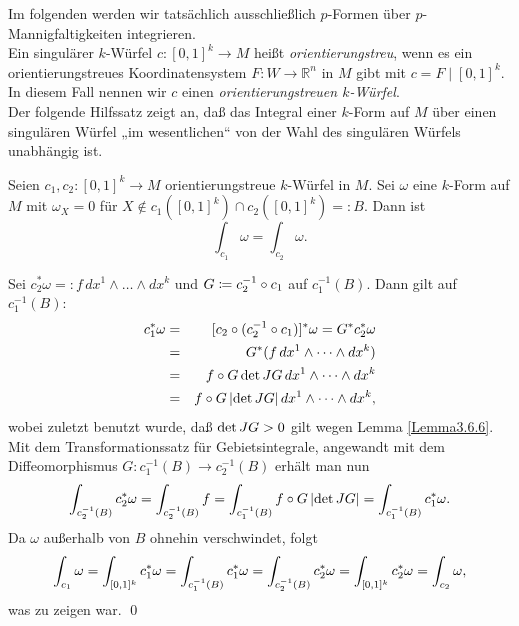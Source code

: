 \documentclass[a4paper,twoside,DIV15,BCOR12mm]{scrbook}
\begin{document}
\noindent
Im folgenden werden wir tatsächlich ausschließlich $p$-Formen über $p$-Mannigfaltigkeiten 
integrieren.\\

 Ein singulärer $k$-Würfel $c: [0,1]^{k} \to M$ 
heißt {\em orientierungstreu}, wenn es ein orientierungstreues Koordinatensystem 
$F: W \to {\mathbb R}^{n}$ in $M$ gibt mit $c = F \mid [0,1]^{k}$. In diesem Fall nennen 
wir $c$ einen {\em orientierungstreuen $k$-Würfel}.\\

\noindent
Der folgende Hilfssatz zeigt an, daß das Integral einer $k$-Form auf $M$ 
über einen singulären Würfel „im wesentlichen“ von der Wahl des 
singulären Würfels unabhängig ist.

\bigskip

\begin{lemma}\label{Lemma3.7.1} {Seien $c_{1},c_{2}: [0,1]^{k} \to M$ 
orientierungstreue  $k$-Würfel in $M$. Sei $\omega$ eine $k$-Form auf $M$ 
mit $\omega_{X} = 0$ für $X \notin c_{1}([0,1]^{k}) \cap c_{2}([0,1]^{k}) =: B$. 
Dann ist}
\[ \int_{c_1} \omega = \int_{c_2} \omega. \]
\end{lemma}


 Sei $c_{2}^{*}\omega =: f \, dx^{1} \wedge \dots \wedge dx^{k}$ 
und $G \da  c_{2}^{-1} \circ c_{1}$ auf $c_{1}^{-1}(B)$. Dann gilt auf $c_{1}^{-1}(B)$:
\begin{eqnarray*}
c_{1}^{*}\omega & = & [c_{2} \circ (c_{2}^{-1} \circ c_{1})]^{*} \omega = 
G^{*} c_{2}^{*} \omega \\
& = & G^{*}(f \, dx^{1} \wedge \dots \wedge dx^{k}) \\
& = & f \circ G\, {\rm det}\, JG \, dx^{1} \wedge \dots \wedge dx^{k} \\
& = & f \circ G\, |{\rm det}\, JG| \, dx^{1} \wedge \dots \wedge dx^{k},
\end{eqnarray*}
wobei zuletzt benutzt wurde, daß ${\rm det}\, JG > 0$ gilt wegen Lemma \ref{Lemma3.6.6}. 
Mit dem Transformationssatz für Gebietsintegrale, angewandt mit dem Diffeomorphismus 
$G:c_1^{-1}(B)\to c_2^{-1}(B)$ erhält man nun
\[
\int_{c_{2}^{-1}(B)} c_{2}^{*} \omega  =  \int_{c_{2}^{-1}(B)} f 
 =  \int_{c_{1}^{-1}(B)} f \circ G\, |{\rm det}\, JG| 
 =  \int_{c_{1}^{-1}(B)} c_{1}^{*} \omega.
\]
Da $\omega$ außerhalb von $B$ ohnehin verschwindet, folgt
\[
\int_{c_1} \omega  =  \int_{[0,1]^{k}} c_{1}^{*} \omega = \int_{c_{1}^{-1}(B)} 
c_{1}^{*} \omega = \int_{c_{2}^{-1}(B)} c_{2}^{*} \omega \\
 =  \int_{[0,1]^{k}} c_{2}^{*} \omega = \int_{c_{2}} \omega,
\]
was zu zeigen war. \qed\\
\end{document}
